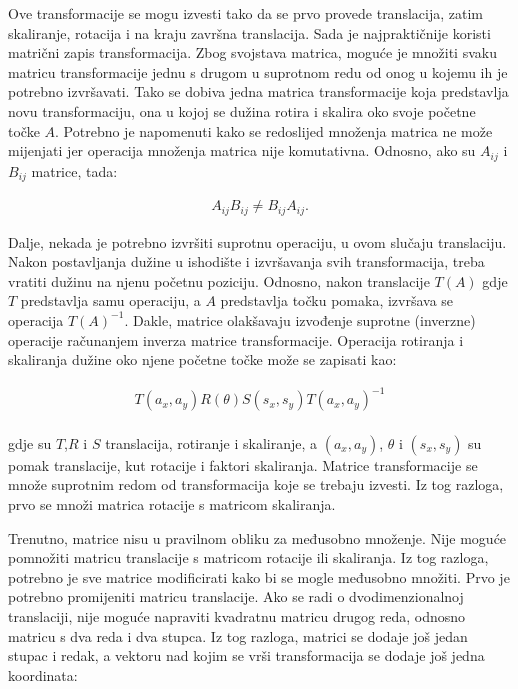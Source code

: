 \documentclass{foi}
\begin{document}
Ove transformacije se mogu izvesti tako da se prvo provede translacija, zatim skaliranje, rotacija i na kraju završna translacija. Sada je najpraktičnije koristi matrični zapis transformacija. Zbog svojstava matrica, moguće je množiti svaku matricu transformacije jednu s drugom u suprotnom redu od onog u kojemu ih je potrebno izvršavati. Tako se dobiva jedna matrica transformacije koja predstavlja novu transformaciju, ona u kojoj se dužina rotira i skalira oko svoje početne točke $A$. Potrebno je napomenuti kako se redoslijed množenja matrica ne može mijenjati jer operacija množenja matrica nije komutativna. Odnosno, ako su $A_{ij}$ i $B_{ij}$ matrice, tada:

\begin{align*}
A_{ij}B_{ij}\neq B_{ij}A_{ij}.
\end{align*}

Dalje, nekada je potrebno izvršiti suprotnu operaciju, u ovom slučaju translaciju. Nakon postavljanja dužine u ishodište i izvršavanja svih transformacija, treba vratiti dužinu na njenu početnu poziciju. Odnosno, nakon translacije $T(A)$ gdje $T$ predstavlja samu operaciju, a $A$ predstavlja točku pomaka, izvršava se operacija $T(A)^{-1}$. Dakle, matrice olakšavaju izvođenje suprotne (inverzne) operacije računanjem inverza matrice transformacije. Operacija rotiranja i skaliranja dužine oko njene početne točke može se zapisati kao:

\begin{align*}
T(a_x,a_y)R(\theta)S(s_x,s_y)T(a_x,a_y)^{-1}
\end{align*}\\
gdje su $T$,$R$ i $S$ translacija, rotiranje i skaliranje, a $(a_x, a_y)$, $\theta$ i $(s_x, s_y)$ su pomak translacije, kut rotacije i faktori skaliranja. Matrice transformacije se množe suprotnim redom od transformacija koje se trebaju izvesti. Iz tog razloga, prvo se množi matrica rotacije s matricom skaliranja. 

Trenutno, matrice nisu u pravilnom obliku za međusobno množenje. Nije moguće pomnožiti matricu translacije s matricom rotacije ili skaliranja. Iz tog razloga, potrebno je sve matrice modificirati kako bi se mogle međusobno množiti. Prvo je potrebno promijeniti matricu translacije. Ako se radi o dvodimenzionalnoj translaciji, nije moguće napraviti kvadratnu matricu drugog reda, odnosno matricu s dva reda i dva stupca. Iz tog razloga, matrici se dodaje još jedan stupac i redak, a vektoru nad kojim se vrši transformacija se dodaje još jedna koordinata:
\end{document}
